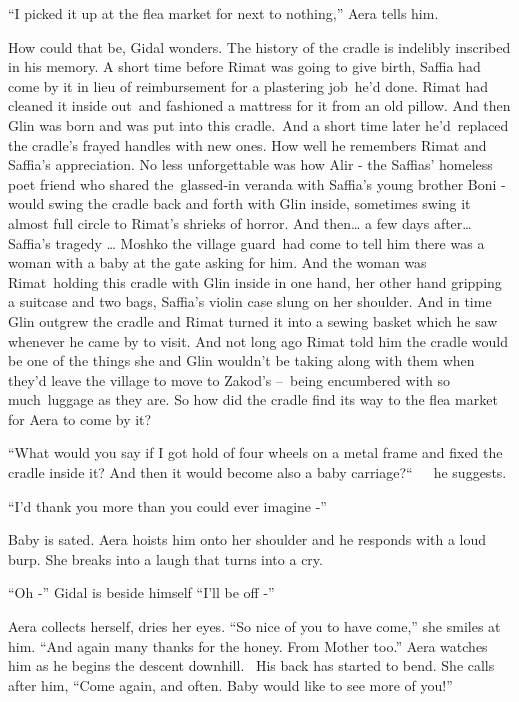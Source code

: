 \documentclass[twoside,11pt]{book}
\begin{document}
``I picked it up at the flea market for next to nothing,'' Aera tells
him{.}

How could that be, Gidal wonders. The history of the cradle is indelibly inscribed in his memory. A short time before
Rimat was going to give birth, Saffia had come by it in lieu of reimbursement for a plastering
job{\ }he'd done. Rimat had cleaned it inside out~and fashioned a mattress for
it from an old pillow. And then Glin was born and was put into this cradle.\ And a short time later he{}'d\ replaced
the cradle's frayed handles with new ones. How well he remembers Rimat and Saffia's appreciation. No less unforgettable
was how Alir - the Saffias' homeless poet friend who shared the\ glassed-in veranda with Saffia's young brother Boni -
would swing the cradle back and forth with Glin inside, sometimes swing it almost full circle to Rimat's shrieks of
horror. And then{\dots} a few days after{\dots} Saffia's tragedy {\dots} Moshko the village guard~had come to tell him
there was a woman with a baby at the gate asking for him. And the woman was Rimat~holding this cradle with Glin inside
in one hand, her other hand gripping a suitcase and two bags, Saffia's violin case slung on her shoulder. And in time
Glin outgrew the cradle and Rimat turned it into a sewing basket which he saw whenever he came by to visit. And not
long ago Rimat told him the cradle would be one of the things she and Glin wouldn{}'t be taking along with them when
they{}'d leave the village to move to Zakod's {{}--}\ being encumbered with so
much\ luggage as they are. So how did the cradle find its way to the flea market for Aera to come by it?

``What would you say if I got hold of four wheels on a metal frame and fixed the cradle inside it? And then
it would become also a baby carriage?``\ \ \ he suggests.

``I'd thank you more than you could ever imagine -'' 

Baby is sated. Aera hoists him onto her shoulder and he responds with a loud burp. She breaks into a laugh that turns
into a cry. 

``Oh -'' Gidal is beside himself ``I'll be off -''

Aera collects herself, dries her eyes. ``So nice of you to have come,'' she smiles at him.
``And again many thanks for the honey. From Mother too.'' Aera watches him as he begins the
descent downhill. \ His back has started to bend. She calls after him, ``Come again, and often. Baby would
like to see more of you!''
\end{document}
